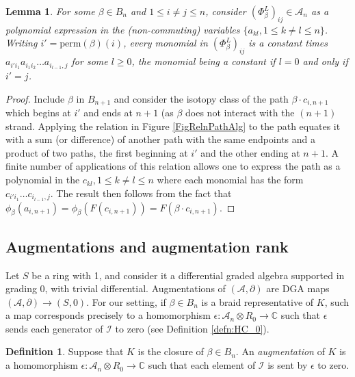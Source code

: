 \documentclass[11pt]{amsart}
\def\C{{\mathbb C}}
\def\A{{\mathcal A}}
\def\s{{\sigma}}
\newtheorem{lem}[thm]{Lemma}
\theoremstyle{definition}
\newtheorem{defn}[thm]{Definition}
\begin{document}
  \begin{lem} For some $\beta\in B_n$ and $1\le i\ne j\le n$, consider $(\Phi_\beta^L)_{ij}\in \A_n$ as a polynomial expression in the (non-commuting) variables $\{a_{kl}, 1\le k\ne l\le n\}$. Writing $i'=\text{perm}(\beta)(i)$, every monomial in $(\Phi_\beta^L)_{ij}$ is a constant times $a_{i'i_1}a_{i_1i_2}\ldots a_{i_{l-1},j}$ for some $l\ge 0$, the monomial being a constant if $l=0$ and only if $i'=j$.
  \label{lem:monomial}
  \end{lem}
  \begin{proof}Include $\beta$ in $B_{n+1}$ and consider the isotopy class of the path $\beta\cdot c_{i,n+1}$ which begins at $i'$ and ends at $n+1$ (as $\beta$ does not interact with the $(n+1)$ strand. Applying the relation in Figure \ref{FigRelnPathAlg} to the path equates it with a sum (or difference) of another path with the same endpoints and a product of two paths, the first beginning at $i'$ and the other ending at $n+1$. A finite number of applications of this relation allows one to express the path as a polynomial in the $c_{kl}, 1\le k\ne l\le n$ where each monomial has the form $c_{i'i_1}\ldots c_{i_{l-1},j}$. The result then follows from the fact that $\phi_\beta(a_{i,n+1}) = \phi_\beta(F(c_{i,n+1})) = F(\beta\cdot c_{i,n+1})$.

  \end{proof}

\subsection{Augmentations and augmentation rank}
\label{SecBG_AugRk}

  Let $S$ be a ring with 1, and consider it a differential graded algebra supported in grading 0, with trivial differential. Augmentations of $(\A,\partial)$ are DGA maps $(\A,\partial)\to (S,0)$. For our setting, if $\beta\in B_n$ is a braid representative of $K$, such a map corresponds precisely to a homomorphism $\epsilon:\A_n\otimes R_0\to\C$ such that $\epsilon$ sends each generator of $\mathcal I$ to zero (see Definition \ref{defn:HC_0}).

  \begin{defn}
  Suppose that $K$ is the closure of $\beta\in B_n$. An \emph{augmentation} of $K$ is a homomorphism $\epsilon: \A_n\otimes R_0\rightarrow \C$ such that each element of $\mathcal I$ is sent by $\epsilon$ to zero.
  \label{defn:Aug}
  \end{defn}
\end{document}
